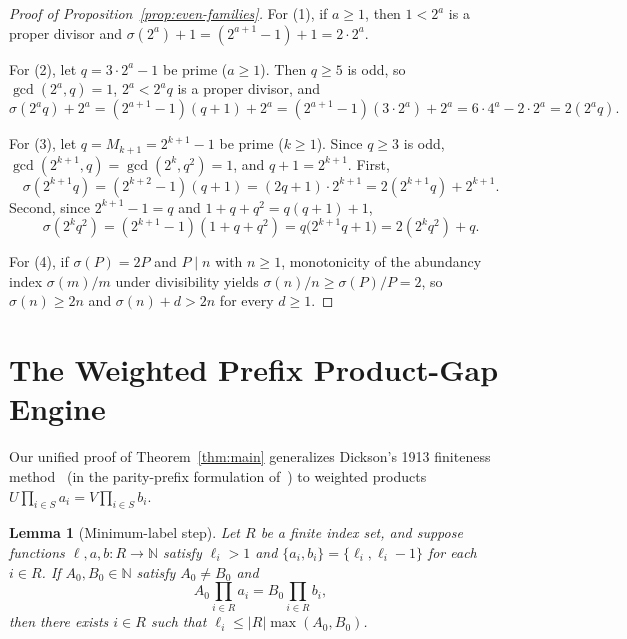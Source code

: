 \documentclass[11pt]{amsart}
\newtheorem{lemma}[theorem]{Lemma}
\theoremstyle{definition}
\theoremstyle{remark}
\begin{document}
\begin{proof}[Proof of Proposition~\ref{prop:even-families}]
For (1), if $a \ge 1$, then $1 < 2^a$ is a proper divisor and $\sigma(2^a) + 1 = (2^{a+1} - 1) + 1 = 2 \cdot 2^a$.

For (2), let $q = 3 \cdot 2^a - 1$ be prime ($a \ge 1$). Then $q \ge 5$ is odd, so $\gcd(2^a, q) = 1$, $2^a < 2^a q$ is a proper divisor, and
\[
  \sigma(2^a q) + 2^a = (2^{a+1} - 1)(q + 1) + 2^a = (2^{a+1} - 1)(3 \cdot 2^a) + 2^a = 6 \cdot 4^a - 2 \cdot 2^a = 2(2^a q).
\]

For (3), let $q = M_{k+1} = 2^{k+1} - 1$ be prime ($k \ge 1$). Since $q \ge 3$ is odd, $\gcd(2^{k+1}, q) = \gcd(2^k, q^2) = 1$, and $q + 1 = 2^{k+1}$. First,
\[
  \sigma(2^{k+1} q) = (2^{k+2} - 1)(q + 1) = (2q + 1) \cdot 2^{k+1} = 2(2^{k+1} q) + 2^{k+1}.
\]
Second, since $2^{k+1} - 1 = q$ and $1 + q + q^2 = q(q + 1) + 1$,
\[
  \sigma(2^k q^2) = (2^{k+1} - 1)(1 + q + q^2) = q\bigl(2^{k+1} q + 1\bigr) = 2(2^k q^2) + q.
\]

For (4), if $\sigma(P) = 2P$ and $P \mid n$ with $n \ge 1$, monotonicity of the abundancy index $\sigma(m)/m$ under divisibility yields $\sigma(n)/n \ge \sigma(P)/P = 2$, so $\sigma(n) \ge 2n$ and $\sigma(n) + d > 2n$ for every $d \ge 1$.
\end{proof}

\section{The Weighted Prefix Product-Gap Engine}

Our unified proof of Theorem~\ref{thm:main} generalizes Dickson's 1913 finiteness method~\cite{Dickson1913} (in the parity-prefix formulation of~\cite{BYU2022,Dittmer2014}) to weighted products $U \prod_{i \in S} a_i = V \prod_{i \in S} b_i$.

\begin{lemma}[Minimum-label step]\label{lem:small-label}
Let $R$ be a finite index set, and suppose functions $\ell, a, b : R \to \mathbb{N}$ satisfy $\ell_i > 1$ and $\{a_i, b_i\} = \{\ell_i, \ell_i - 1\}$ for each $i \in R$. If $A_0, B_0 \in \mathbb{N}$ satisfy $A_0 \ne B_0$ and
\[
  A_0 \prod_{i \in R} a_i = B_0 \prod_{i \in R} b_i,
\]
then there exists $i \in R$ such that $\ell_i \le |R| \max(A_0, B_0)$.
\end{lemma}
\end{document}
